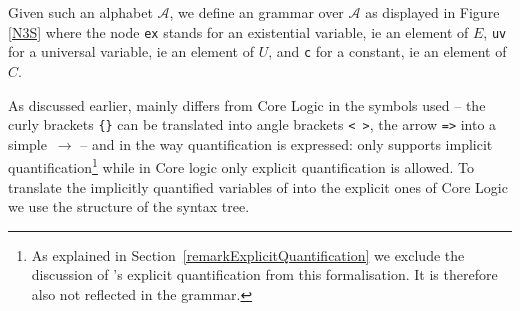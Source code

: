 Given such an \nthree alphabet $\mathcal{A}$, we define an \nthree grammar over $\mathcal{A}$ as displayed  
in Figure \ref{N3S}
where the node \texttt{ex} stands for an existential variable, ie an element of $E$, \texttt{uv} for a universal variable, ie an element of $U$, and \texttt{c} for a constant, ie an 
element of $C$. 
%

As discussed earlier, \nthreelogic mainly differs from \nthree Core Logic in the symbols used --
the curly brackets \texttt{\{\}} can be translated 
into angle brackets \verb!< >!, the \nthree arrow \texttt{=>} into a simple~$\rightarrow$ -- 
%  
and in the way quantification is expressed: \nthreelogic only supports implicit quantification\footnote{As explained in Section~\ref{remarkExplicitQuantification} we exclude the discussion of 
\nthree's explicit quantification from this formalisation. It is therefore also not reflected in the grammar.} while in \nthree Core logic only explicit quantification 
is allowed. %
To translate the implicitly quantified variables of \nthree into the explicit ones of \nthree Core Logic we use 
the structure of the syntax tree. 


